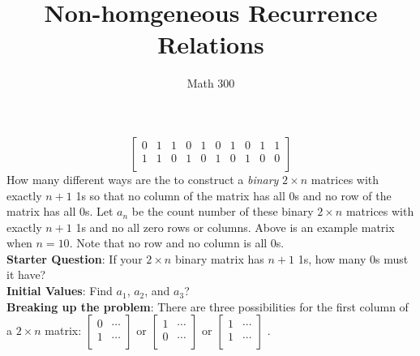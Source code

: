 \documentclass[11pt]{amsart}
\title{Non-homgeneous Recurrence Relations}
\author{Math 300}
\begin{document}
\maketitle

$$\left[
   \begin{matrix} %
      0 & 1 & 1& 0& 1& 0& 1& 0& 1& 1\\
      1 & 1 & 0& 1& 0& 1& 0& 1& 0& 0\\
   \end{matrix}
   \right]
$$ 
 How many different ways are the to construct a \textit{binary} $2 \times n$ matrices with exactly $n+1$ 1s so that no column of the matrix has all 0s and no row of the matrix has all 0s. Let $a_n$ be the count number of these binary $2 \times n$ matrices with exactly $n+1$ 1s and no all zero rows or columns.  Above is an example matrix when $n=10$. Note that no row and no column is all 0s.\\
  {\bf Starter Question}:  If your $2 \times n$ binary matrix has $n+1$ 1s, how many 0s must it have?\\ \vfill
{\bf Initial Values}:  Find  $a_1$, $a_2$, and $a_3$?\\  \vfill
{\bf Breaking up the problem}: There are three possibilities for the first column of a $2 \times n$ matrix:
$\left[
   \begin{matrix} %
      0& \cdots\\
      1 & \cdots\\
   \end{matrix}
   \right]$ or
   $\left[
   \begin{matrix} %
      1& \cdots\\
      0 & \cdots\\
   \end{matrix}
   \right]$ or
   $\left[
   \begin{matrix} %
      1& \cdots\\
      1 & \cdots\\
   \end{matrix}
   \right]$ .
\end{document}
